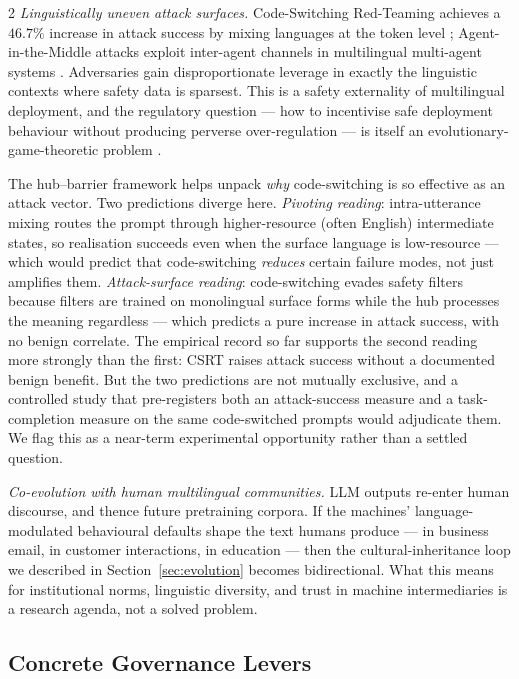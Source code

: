 \documentclass[openacc]{rsproca_new}
\begin{document}
\begin{multicols}{2}
\emph{Linguistically uneven attack surfaces.} Code-Switching Red-Teaming achieves a $46.7\%$ increase in attack success by mixing languages at the token level \cite{yoo2025csrt}; Agent-in-the-Middle attacks exploit inter-agent channels in multilingual multi-agent systems \cite{he2025agentmiddle}. Adversaries gain disproportionate leverage in exactly the linguistic contexts where safety data is sparsest. This is a safety externality of multilingual deployment, and the regulatory question --- how to incentivise safe deployment behaviour without producing perverse over-regulation --- is itself an evolutionary-game-theoretic problem \cite{han2022pledges}.

The hub--barrier framework helps unpack \emph{why} code-switching is so effective as an attack vector. Two predictions diverge here. \emph{Pivoting reading}: intra-utterance mixing routes the prompt through higher-resource (often English) intermediate states, so realisation succeeds even when the surface language is low-resource --- which would predict that code-switching \emph{reduces} certain failure modes, not just amplifies them. \emph{Attack-surface reading}: code-switching evades safety filters because filters are trained on monolingual surface forms while the hub processes the meaning regardless --- which predicts a pure increase in attack success, with no benign correlate. The empirical record so far supports the second reading more strongly than the first: CSRT raises attack success without a documented benign benefit. But the two predictions are not mutually exclusive, and a controlled study that pre-registers both an attack-success measure and a task-completion measure on the same code-switched prompts would adjudicate them. We flag this as a near-term experimental opportunity rather than a settled question.

\emph{Co-evolution with human multilingual communities.} LLM outputs re-enter human discourse, and thence future pretraining corpora. If the machines' language-modulated behavioural defaults shape the text humans produce --- in business email, in customer interactions, in education --- then the cultural-inheritance loop we described in Section~\ref{sec:evolution} becomes bidirectional. What this means for institutional norms, linguistic diversity, and trust in machine intermediaries is a research agenda, not a solved problem.

\subsection{Concrete Governance Levers}\label{sec:governance}


\end{multicols}
\end{document}
